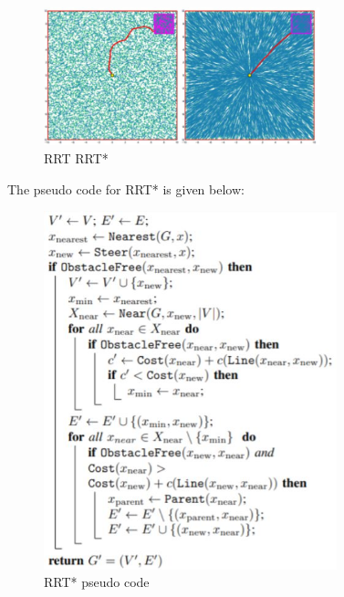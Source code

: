 \documentclass{IEEEtran}
\begin{document}
\begin{enumerate}
\begin{figure}[h]
    \centering
    \includegraphics[width=8cm]{pRRT2}
    \caption{RRT  \hspace{1.8in}RRT*}
    \label{fig:RRT}
\end{figure}
The pseudo code for RRT* is given below:
\begin{figure}[h]
    \centering
    \includegraphics[width=8.5cm]{pRRT1}
    \caption{RRT* pseudo code}
    \label{fig:RRT}
\end{figure}


\end{enumerate}
\end{document}
